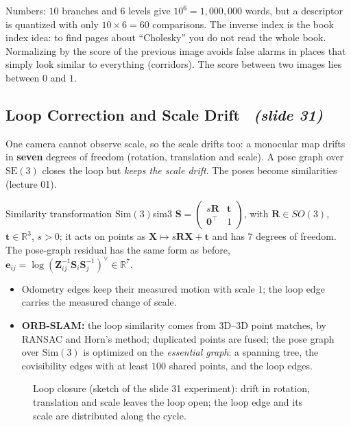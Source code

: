 \documentclass[11pt,a4paper]{article}
\newcommand{\slrs}[1]{\texorpdfstring{\ \emph{(slide #1)}}{ (slide #1)}}
\newcommand{\R}{\mathbb{R}}
\newcommand{\be}{\mathbf{e}}
\newcommand{\bX}{\mathbf{X}}
\newcommand{\SE}{\mathrm{SE}(3)}
\newcommand{\Sim}{\mathrm{Sim}(3)}
\begin{document}
\begin{intuition}
Numbers: $10$ branches and $6$ levels give $10^6=1{,}000{,}000$ words, but a descriptor is quantized with only $10\times6=60$ comparisons. The inverse index is the book index idea: to find pages about ``Cholesky'' you do not read the whole book. Normalizing by the score of the previous image avoids false alarms in places that simply look similar to everything (corridors). The score between two images lies between $0$ and $1$.
\end{intuition}

\subsection{Loop Correction and Scale Drift \slrs{31}}
One camera cannot observe scale, so the scale drifts too: a monocular map drifts in \textbf{seven} degrees of freedom (rotation, translation and scale). A pose graph over $\SE$ closes the loop but \emph{keeps the scale drift}. The poses become similarities (lecture 01).
\begin{definition}{Similarity transformation $\Sim$}{sim3}
$\mathbf S=\begin{pmatrix}s\mathbf R&\mathbf t\\\mathbf 0^\top&1\end{pmatrix}$, with $\mathbf R\in SO(3)$, $\mathbf t\in\R^3$, $s>0$; it acts on points as $\bX\mapsto s\mathbf R\bX+\mathbf t$ and has $7$ degrees of freedom. The pose-graph residual has the same form as before, $\be_{ij}=\log(\mathbf Z_{ij}^{-1}\mathbf S_i\mathbf S_j^{-1})^\vee\in\R^7$.
\end{definition}
\begin{itemize}[nosep]
\item Odometry edges keep their measured motion with scale $1$; the loop edge carries the measured change of scale.
\item \textbf{ORB-SLAM:} the loop similarity comes from 3D--3D point matches, by RANSAC and Horn's method; duplicated points are fused; the pose graph over $\Sim$ is optimized on the \emph{essential graph}: a spanning tree, the covisibility edges with at least $100$ shared points, and the loop edges.
\end{itemize}
\begin{figure}[htbp]\centering
{}
\caption{Loop closure (sketch of the slide 31 experiment): drift in rotation, translation and scale leaves the loop open; the loop edge and its scale are distributed along the cycle.}
\end{figure}
\end{document}
